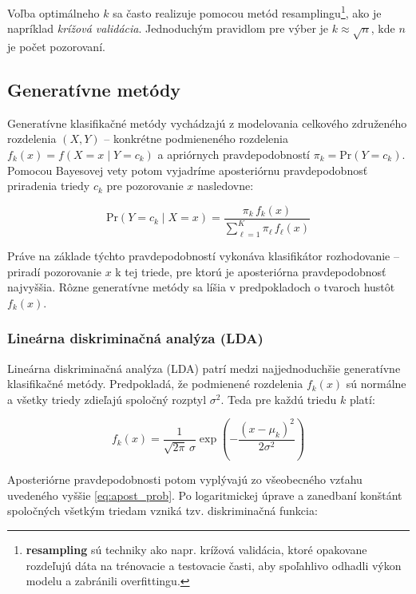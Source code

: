 Voľba optimálneho $k$ sa často realizuje pomocou metód resamplingu\footnote{\textbf{resampling} sú techniky ako napr. krížová validácia, ktoré opakovane rozdeľujú dáta na trénovacie a testovacie časti, aby spoľahlivo odhadli výkon modelu a zabránili overfittingu.}, ako je napríklad \textit{krížová validácia}. Jednoduchým pravidlom pre výber je $k \approx \sqrt{n}$, kde $n$ je počet pozorovaní.

\subsection{Generatívne metódy}
\label{subsec:gener_methods}

Generatívne klasifikačné metódy vychádzajú z modelovania celkového združeného rozdelenia $(X, Y)$ – konkrétne podmieneného rozdelenia $f_k(x) = f(X = x \mid Y = c_k)$ a apriórnych pravdepodobností $\pi_k = \mathrm{Pr}(Y = c_k)$. Pomocou Bayesovej vety potom vyjadríme aposteriórnu pravdepodobnosť priradenia triedy $c_k$ pre pozorovanie $x$ nasledovne:

\begin{equation}\label{eq:apost_prob}
\mathrm{Pr}(Y = c_k \mid X = x) = \frac{\pi_k \, f_k(x)}{\sum\limits_{\ell = 1}^{K} \pi_\ell \, f_\ell(x)}
\end{equation}

Práve na základe týchto pravdepodobností vykonáva klasifikátor rozhodovanie – priradí pozorovanie $x$ k tej triede, pre ktorú je aposteriórna pravdepodobnosť najvyššia. Rôzne generatívne metódy sa líšia v predpokladoch o tvaroch hustôt $f_k(x)$.

\subsubsection{Lineárna diskriminačná analýza (LDA)}
\label{subsubsec:lda}

Lineárna diskriminačná analýza (LDA) patrí medzi najjednoduchšie generatívne klasifikačné metódy. Predpokladá, že podmienené rozdelenia $f_k(x)$ sú normálne a všetky triedy zdieľajú spoločný rozptyl $\sigma^2$. Teda pre každú triedu $k$ platí:

\begin{equation}
f_k(x) = \frac{1}{\sqrt{2\pi} \, \sigma} \exp\left( -\frac{(x - \mu_k)^2}{2\sigma^2} \right)
\end{equation}

Aposteriórne pravdepodobnosti potom vyplývajú zo všeobecného vzťahu uvedeného vyššie \eqref{eq:apost_prob}. Po logaritmickej úprave a zanedbaní konštánt spoločných všetkým triedam vzniká tzv. diskriminačná funkcia:

